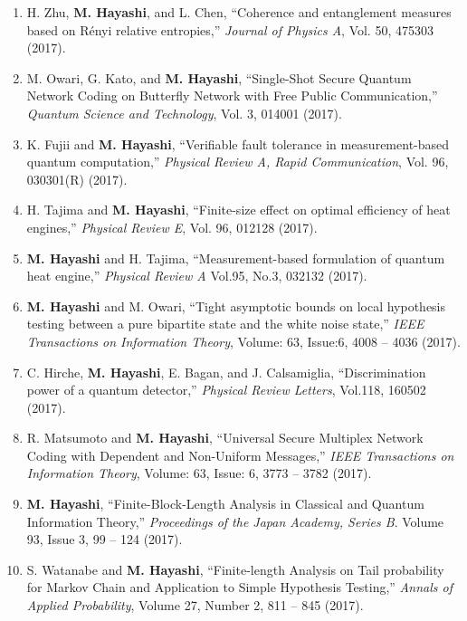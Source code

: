 \documentclass[a4paper,12pt,oneside]{article}
\begin{document}
\begin{enumerate}
\item 
H. Zhu, \textbf{M. Hayashi}, and L. Chen, 
``Coherence and entanglement measures based on R\'{e}nyi relative entropies,''
{\em Journal of Physics A},
Vol. 50, 475303 (2017).

\item
M. Owari, G. Kato, and \textbf{M. Hayashi},
``Single-Shot Secure Quantum Network Coding on Butterfly Network with Free Public Communication,''
{\em Quantum Science and Technology},
Vol. 3, 014001 (2017). 

\item
K. Fujii and \textbf{M. Hayashi},
``Verifiable fault tolerance in measurement-based quantum computation,''
{\em Physical Review A, Rapid Communication},
Vol. 96, 030301(R) (2017).

\item
H. Tajima and \textbf{M. Hayashi},
``Finite-size effect on optimal efficiency of heat engines,''
{\em Physical Review E}, Vol. 96, 012128 (2017).

\item
\textbf{M. Hayashi} and H. Tajima, 
``Measurement-based formulation of quantum heat engine,'' 
{\em Physical Review A} Vol.95, No.3, 032132 (2017). 

\item
\textbf{M. Hayashi} and M. Owari, 
``Tight asymptotic bounds on local hypothesis testing between a pure bipartite state and the white noise state,'' 
{\em IEEE Transactions on Information Theory}, 
Volume: 63, Issue:6, 4008 -- 4036 (2017). 

\item
C. Hirche, \textbf{M. Hayashi}, E. Bagan, and J. Calsamiglia, 
``Discrimination power of a quantum detector,'' 
{\em Physical Review Letters}, Vol.118, 160502 (2017). 

\item
R. Matsumoto and \textbf{M. Hayashi},  
``Universal Secure Multiplex Network Coding with Dependent and Non-Uniform Messages,'' 
{\em IEEE Transactions on Information Theory}, Volume: 63, Issue: 6, 3773 -- 3782 (2017). 

\item 
\textbf{M. Hayashi}, ``Finite-Block-Length Analysis in Classical and Quantum Information Theory,'' 
{\em Proceedings of the Japan Academy, Series B}.
Volume 93, Issue 3, 99 -- 124 (2017).

\item 
S. Watanabe and \textbf{M. Hayashi}, ``Finite-length Analysis on Tail probability for Markov Chain and Application to Simple Hypothesis Testing,'' 
{\em Annals of Applied Probability},
Volume 27, Number 2, 811 -- 845 (2017).


\end{enumerate}
\end{document}
